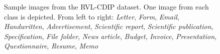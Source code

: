 \begin{figure}
\begin{subfigure}{.12\linewidth}
\end{subfigure}
\begin{subfigure}{.12\linewidth}
  \centering
\end{subfigure}
\begin{subfigure}{.12\linewidth}
  \centering
\end{subfigure}
\begin{subfigure}{.12\linewidth}
  \centering
\end{subfigure}
\begin{subfigure}{.12\linewidth}
  \centering
\end{subfigure}
\caption{Sample images from the RVL-CDIP dataset. One image from each class is depicted. From left to right: \emph{Letter}, \emph{Form}, \emph{Email}, \emph{Handwritten}, \emph{Advertisement}, \emph{Scientific report}, \emph{Scientific publication}, \emph{Specification}, \emph{File folder}, \emph{News article}, \emph{Budget}, \emph{Invoice}, \emph{Presentation}, \emph{Questionnaire}, \emph{Resume}, \emph{Memo}}
\label{fig:docimages}
\end{figure}


